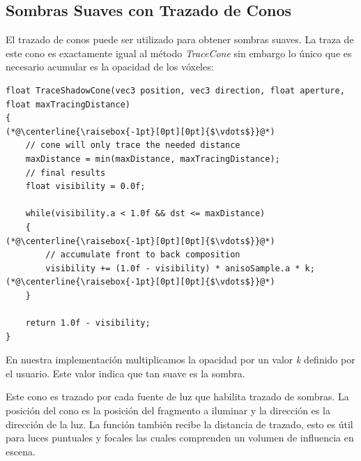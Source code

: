 \subsection{Sombras Suaves con Trazado de Conos} %
\label{sub:sombras_con_trazado_de_conos}
El trazado de conos puede ser utilizado para obtener sombras suaves. La traza de este cono es exactamente igual al método \emph{TraceCone} sin embargo lo único que es necesario acumular es la opacidad de los vóxeles:
\\
\begin{lstlisting}[caption={Trazado de sombras con conos.}, label=ShadowCone]
float TraceShadowCone(vec3 position, vec3 direction, float aperture, float maxTracingDistance)
{
(*@\centerline{\raisebox{-1pt}[0pt][0pt]{$\vdots$}}@*)
    // cone will only trace the needed distance
    maxDistance = min(maxDistance, maxTracingDistance);
    // final results
    float visibility = 0.0f;
    
    while(visibility.a < 1.0f && dst <= maxDistance)
    {
(*@\centerline{\raisebox{-1pt}[0pt][0pt]{$\vdots$}}@*)
        // accumulate front to back composition
        visibility += (1.0f - visibility) * anisoSample.a * k;
(*@\centerline{\raisebox{-1pt}[0pt][0pt]{$\vdots$}}@*)
    }

    return 1.0f - visibility;
}
\end{lstlisting}
En nuestra implementación multiplicamos la opacidad por un valor \emph{k} definido por el usuario. Este valor indica que tan suave es la sombra.

Este cono es trazado por cada fuente de luz que habilita trazado de sombras. La posición del cono es la posición del fragmento a iluminar y la dirección es la dirección de la luz. La función también recibe la distancia de trazado, esto es útil para luces puntuales y focales las cuales comprenden un volumen de influencia en escena.

